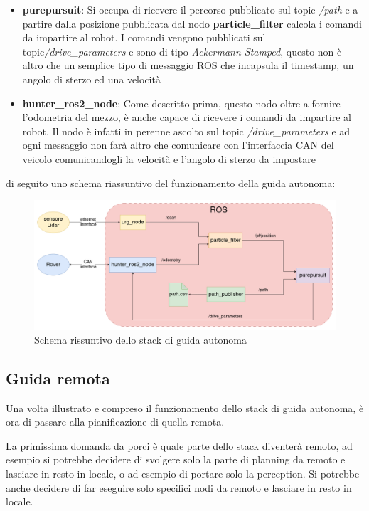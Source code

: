 \begin{itemize}
  \item \textbf{purepursuit}: Si occupa di ricevere il percorso pubblicato sul topic \textit{/path} e a partire dalla posizione pubblicata dal nodo \textbf{particle\_filter} calcola i comandi da impartire al robot. I comandi vengono pubblicati sul topic\textit{/drive\_parameters} e sono di tipo \textit{Ackermann Stamped}, questo non è altro che un semplice tipo di messaggio ROS che incapsula il timestamp, un angolo di sterzo ed una velocità
  \item \textbf{hunter\_ros2\_node}: Come descritto prima, questo nodo oltre a fornire l'odometria del mezzo, è anche capace di ricevere i comandi da impartire al robot. Il nodo è infatti in perenne ascolto sul topic \textit{/drive\_parameters} e ad ogni messaggio non farà altro che comunicare con l'interfaccia CAN del veicolo comunicandogli la velocità e l'angolo di sterzo da impostare
\end{itemize}

\noindent di seguito uno schema riassuntivo del funzionamento della guida autonoma:
\begin{figure}[h]
  \centering
  \includegraphics[width=1\textwidth]{figures/schema_guida_autonoma.png}
  \caption{Schema rissuntivo dello stack di guida autonoma}
  \label{Schema rissuntivo dello stack di guida autonoma}
\end{figure}

\subsection{Guida remota}
Una volta illustrato e compreso il funzionamento dello stack di guida autonoma, è ora di passare alla pianificazione di quella remota.

\noindent La primissima domanda da porci è quale parte dello stack diventerà remoto, ad esempio si potrebbe decidere di svolgere solo la parte di planning da remoto e lasciare in resto in locale, o ad esempio di portare solo la perception. Si potrebbe anche decidere di far eseguire solo specifici nodi da remoto e lasciare in resto in locale.

